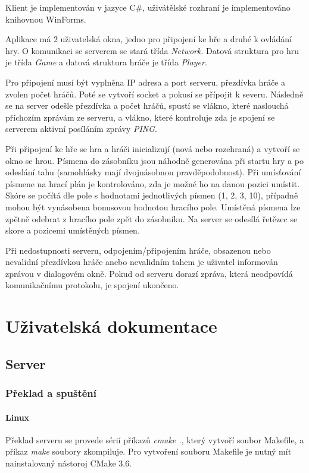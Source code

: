 Klient je implementován v jazyce C\#, uživátělské rozhraní je implementováno knihovnou WinForms.

Aplikace má 2 uživatelská okna, jedno pro připojení ke hře a druhé k ovládání hry. O komunikaci se serverem se stará třída \emph{Network}. Datová struktura pro hru je třída \emph{Game} a datová struktura hráče je třída \emph{Player}.

Pro připojení musí být vyplněna IP adresa a port serveru, přezdívka hráče a zvolen počet hráčů. Poté se vytvoří socket a pokusí se přípojit k severu. Následně se na server odešle přezdívka a počet hráčů, spustí se vlákno, které naslouchá příchozím zprávám ze serveru, a vlákno, které kontroluje zda je spojení se serverem aktivní posíláním zprávy \emph{PING}.

Při připojení ke hře se hra a hráči inicializují (nová nebo rozehraná) a vytvoří se okno se hrou. Písmena do zásobníku jsou náhodně generována při startu hry a po odeslání tahu (samohlásky mají dvojnásobnou pravděpodobnost). Při umísťování písmene na hrací plán je kontrolováno, zda je možné ho na danou pozici umístit. Skóre se počítá dle pole s hodnotami jednotlivých písmen (1, 2, 3, 10), případně mohou být vynásobena bonusovou hodnotou hracího pole. Umístěná písmena lze zpětně odebrat z hracího pole zpět do zásobníku. Na server se odesílá řetězec se skore a pozicemi umístěných písmen.

Při nedostupnosti serveru, odpojením/připojením hráče, obsazenou nebo nevalidní přezdívkou hráče anebo nevalidním tahem je uživatel informován zprávou v dialogovém okně. Pokud od serveru dorazí zpráva, která neodpovídá komunikačnímu protokolu, je spojení ukončeno.



\chapter{Uživatelská dokumentace}

\section{Server}
\subsection{Překlad a spuštění}
\subsubsection{Linux}
Překlad serveru se provede sérií příkazů \emph{cmake .}, který vytvoří soubor Makefile, a příkaz \emph{make} soubory zkompiluje. Pro vytvoření souboru Makefile je nutný mít nainstalovaný nástoroj CMake 3.6.

